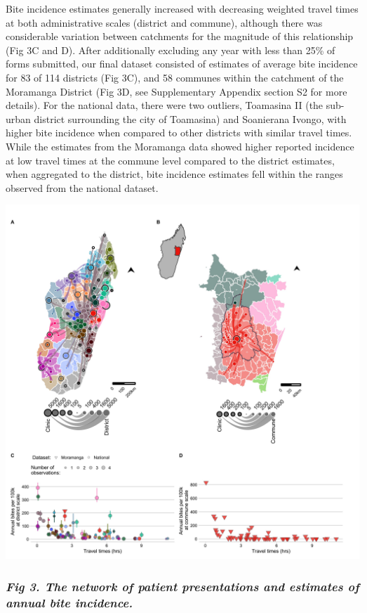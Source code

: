 \documentclass[
]{book}
\begin{document}
Bite incidence estimates generally increased with decreasing weighted
travel times at both administrative scales (district and commune),
although there was considerable variation between catchments for the
magnitude of this relationship (Fig 3C and D). After additionally
excluding any year with less than 25\% of forms submitted, our final
dataset consisted of estimates of average bite incidence for 83 of 114
districts (Fig 3C), and 58 communes within the catchment of the
Moramanga District (Fig 3D, see Supplementary Appendix section S2 for
more details). For the national data, there were two outliers, Toamasina
II (the sub-urban district surrounding the city of Toamasina) and
Soanierana Ivongo, with higher bite incidence when compared to other
districts with similar travel times. While the estimates from the
Moramanga data showed higher reported incidence at low travel times at
the commune level compared to the district estimates, when aggregated to
the district, bite incidence estimates fell within the ranges observed
from the national dataset.

\includegraphics[width=0.9\linewidth]{figs/ch2/fig3}

\hypertarget{fig-3.-the-network-of-patient-presentations-and-estimates-of-annual-bite-incidence.}{%
\subsubsection{\texorpdfstring{\emph{Fig 3. The network of patient presentations and estimates of annual bite incidence.}}{Fig 3. The network of patient presentations and estimates of annual bite incidence.}}\label{fig-3.-the-network-of-patient-presentations-and-estimates-of-annual-bite-incidence.}}
\end{document}
